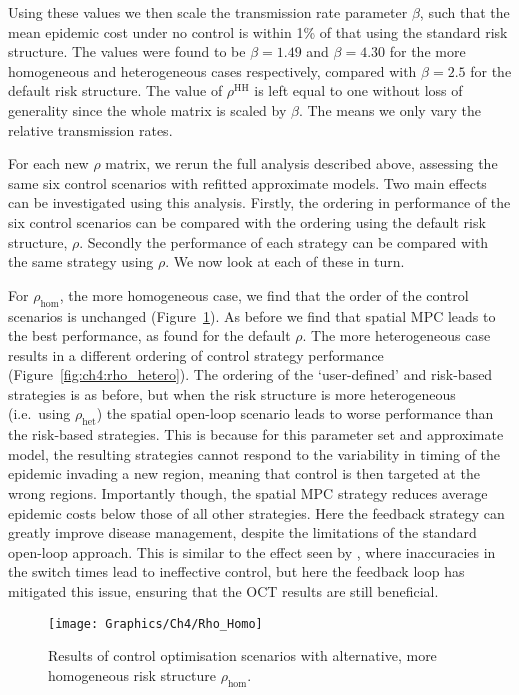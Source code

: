 Using these values we then scale the transmission rate parameter $\beta$, such that the mean epidemic cost under no control is within 1\% of that using the standard risk structure. The values were found to be $\beta=1.49$ and $\beta=4.30$ for the more homogeneous and heterogeneous cases respectively, compared with $\beta=2.5$ for the default risk structure. The value of $\rho^{\mathrm{HH}}$ is left equal to one without loss of generality since the whole matrix is scaled by $\beta$. The means we only vary the relative transmission rates.

For each new $\rho$ matrix, we rerun the full analysis described above, assessing the same six control scenarios with refitted approximate models. Two main effects can be investigated using this analysis. Firstly, the ordering in performance of the six control scenarios can be compared with the ordering using the default risk structure, $\rho$. Secondly the performance of each strategy can be compared with the same strategy using $\rho$. We now look at each of these in turn.

For $\rho_{\mathrm{hom}}$, the more homogeneous case, we find that the order of the control scenarios is unchanged (Figure~\ref{fig:ch4:rho_homo}). As before we find that spatial MPC leads to the best performance, as found for the default $\rho$. The more heterogeneous case results in a different ordering of control strategy performance (Figure~\ref{fig:ch4:rho_hetero}). The ordering of the `user-defined' and risk-based strategies is as before, but when the risk structure is more heterogeneous (i.e.\ using $\rho_{\mathrm{het}}$) the spatial open-loop scenario leads to worse performance than the risk-based strategies. This is because for this parameter set and approximate model, the resulting strategies cannot respond to the variability in timing of the epidemic invading a new region, meaning that control is then targeted at the wrong regions. Importantly though, the spatial MPC strategy reduces average epidemic costs below those of all other strategies. Here the feedback strategy can greatly improve disease management, despite the limitations of the standard open-loop approach. This is similar to the effect seen by \citet{forster_optimizing_2007}, where inaccuracies in the switch times lead to ineffective control, but here the feedback loop has mitigated this issue, ensuring that the OCT results are still beneficial.

\begin{figure}
    \begin{center}
        \texttt{[image: Graphics/Ch4/Rho\_Homo]}
        \caption[Control strategy performance with more homogeneous risk structure]{Results of control optimisation scenarios with alternative, more homogeneous risk structure $\rho_{\mathrm{hom}}$.}
        \label{fig:ch4:rho_homo}
    \end{center}
\end{figure}

